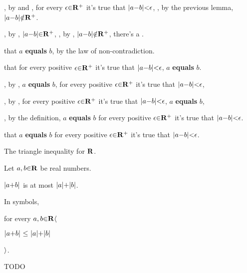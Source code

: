       \hs\hs\hs{}, by  and , for every $\epsilon \p\in \R^+$ it's true that $\a|a \p- b\a| \p< \epsilon$, , by the previous lemma,  $\a|a \p- b\a| \p\notin \R^+$. \par
      \hs\hs\hs{}, by , $\a|a \p- b\a| \p\in \R^+$, , by , $\a|a \p- b\a| \p\notin \R^+$,  there's a . \par
    \hs\hs {} that $a$ {\bf equals} $b$, by the law of non-contradiction. \par
  \hs{} that   for every positive $\epsilon\p\in \R^+$ it's true that $\a|a \p- b\a| \p< \epsilon$,  $a$ {\bf equals} $b$. \par

  \vs
  \hs{}, by ,  $a$ {\bf equals} $b$,  for every positive $\epsilon\p\in \R^+$ it's true that $\a|a \p- b\a| \p< \epsilon$, \par
  \hs{},   by ,  for every positive $\epsilon\p\in \R^+$ it's true that $\a|a \p- b\a| \p< \epsilon$,  $a$ {\bf equals} $b$, \par
  \hs{},  by the  definition, $a$ {\bf equals} $b$  for every positive $\epsilon\p\in \R^+$ it's true that $\a|a \p- b\a| \p< \epsilon$. \par

\vs
{} that $a$ {\bf equals} $b$  for every positive $\epsilon\p\in \R^+$ it's true that $\a|a \p- b\a| \p< \epsilon$.

\vs
\theorem The triangle inequality for ${\bf R}$. \par
Let $a,b \p\in \R$ be real numbers. \par
   $\a|a \p+ b\a|$ is at most $\a|a\a| \p+ \a|b\a|$. \par
In symbols, \par

  \hs for every $a,b \p\in \R \a\langle$ \par
  \hs\hs $\a|a \p+ b\a| ~\p\leq~ \a|a\a| \p+ \a|b\a|$ \par
  \hs $\a\rangle$. \par

\proof TODO




